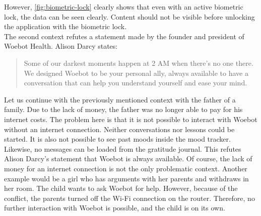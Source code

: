 However, \autoref{fig:biometric-lock} clearly shows that even with an active biometric lock, the data can be seen clearly.
Content should not be visible before unlocking the application with the biometric lock.\\

The second context refutes a statement made by the founder and president of Woebot Health.
Alison Darcy states\cite{woebot-about}:
\begin{quote}
    Some of our darkest moments happen at 2 AM when there's no one there.
    We designed Woebot to be your personal ally, always available to have a conversation that can help you understand yourself and ease your mind.
\end{quote}
Let us continue with the previously mentioned context with the father of a family.
Due to the lack of money, the father was no longer able to pay for his internet costs.
The problem here is that it is not possible to interact with Woebot without an internet connection.
Neither conversations nor lessons could be started.
It is also not possible to see past moods inside the mood tracker.
Likewise, no messages can be loaded from the gratitude journal.
This refutes Alison Darcy's statement that Woebot is always available.
Of course, the lack of money for an internet connection is not the only problematic context.
Another example would be a girl who has arguments with her parents and withdraws in her room.
The child wants to ask Woebot for help. However, because of the conflict, the parents turned off the Wi-Fi connection on the router.
Therefore, no further interaction with Woebot is possible, and the child is on its own.


